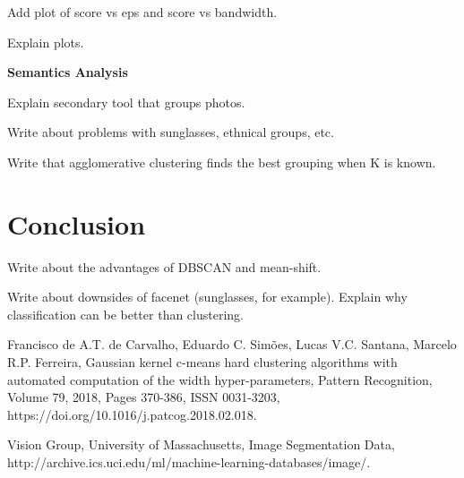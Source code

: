 \documentclass[conference]{IEEEtran}
\begin{document}
Add plot of score vs eps and score vs bandwidth.

Explain plots.

\textbf{Semantics Analysis}

Explain secondary tool that groups photos.

Write about problems with sunglasses, ethnical groups, etc.

Write that agglomerative clustering finds the best grouping when K is known.

\section{Conclusion}

Write about the advantages of DBSCAN and mean-shift.

Write about downsides of facenet (sunglasses, for example).
Explain why classification can be better than clustering.

\begin{thebibliography}{00}
 Francisco de A.T. de Carvalho, Eduardo C. Simões, Lucas V.C. Santana, Marcelo R.P. Ferreira,
Gaussian kernel c-means hard clustering algorithms with automated computation of the width hyper-parameters,
Pattern Recognition,
Volume 79,
2018,
Pages 370-386,
ISSN 0031-3203,
https://doi.org/10.1016/j.patcog.2018.02.018.

 Vision Group, University of Massachusetts, 
Image Segmentation Data,
http://archive.ics.uci.edu/ml/machine-learning-databases/image/.

\end{thebibliography}
\end{document}
